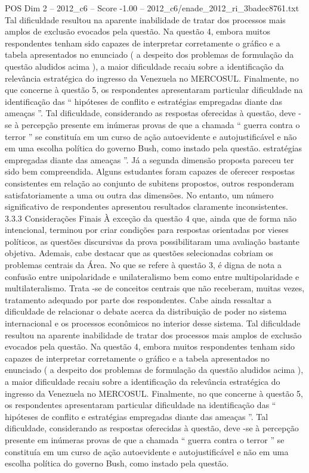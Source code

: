 \begin{textsample}{POS Dim 2 – 2012\_c6 – Score -1.00 – 2012\_c6/enade\_2012\_ri\_3badec8761.txt}
Tal dificuldade resultou na aparente inabilidade de tratar dos processos mais amplos de exclusão evocados pela questão.
Na questão 4, embora muitos respondentes tenham sido capazes de interpretar corretamente o gráfico e a tabela apresentados no enunciado ( a despeito dos problemas de formulação da questão aludidos acima ), a maior dificuldade recaiu sobre a identificação da relevância estratégica do ingresso da Venezuela no MERCOSUL.
Finalmente, no que concerne à questão 5, os respondentes apresentaram particular dificuldade na identificação das “ hipóteses de conflito e estratégias empregadas diante das ameaças ”.
Tal dificuldade, considerando as respostas oferecidas à questão, deve -se à percepção presente em inúmeras provas de que a chamada “ guerra contra o terror ” se constituía em um curso de ação autoevidente e autojustificável e não em uma escolha política do governo Bush, como instado pela questão. estratégias empregadas diante das ameaças ”.
Já a segunda dimensão proposta pareceu ter sido bem compreendida.
Alguns estudantes foram capazes de oferecer respostas consistentes em relação ao conjunto de subitens propostos, outros responderam satisfatoriamente a uma ou outra das dimensões.
No entanto, um número significativo de respondentes apresentou resultados claramente inconsistentes. 3.3.3 Considerações Finais À exceção da questão 4 que, ainda que de forma não intencional, terminou por criar condições para respostas orientadas por vieses políticos, as questões discursivas da prova possibilitaram uma avaliação bastante objetiva.
Ademais, cabe destacar que as questões selecionadas cobriam os problemas centrais da Área.
No que se refere à questão 3, é digna de nota a confusão entre unipolaridade e unilateralismo bem como entre multipolaridade e multilateralismo.
Trata -se de conceitos centrais que não receberam, muitas vezes, tratamento adequado por parte dos respondentes.
Cabe ainda ressaltar a dificuldade de relacionar o debate acerca da distribuição de poder no sistema internacional e os processos econômicos no interior desse sistema.
Tal dificuldade resultou na aparente inabilidade de tratar dos processos mais amplos de exclusão evocados pela questão.
Na questão 4, embora muitos respondentes tenham sido capazes de interpretar corretamente o gráfico e a tabela apresentados no enunciado ( a despeito dos problemas de formulação da questão aludidos acima ), a maior dificuldade recaiu sobre a identificação da relevância estratégica do ingresso da Venezuela no MERCOSUL.
Finalmente, no que concerne à questão 5, os respondentes apresentaram particular dificuldade na identificação das “ hipóteses de conflito e estratégias empregadas diante das ameaças ”.
Tal dificuldade, considerando as respostas oferecidas à questão, deve -se à percepção presente em inúmeras provas de que a chamada “ guerra contra o terror ” se constituía em um curso de ação autoevidente e autojustificável e não em uma escolha política do governo Bush, como instado pela questão.

\end{textsample}
